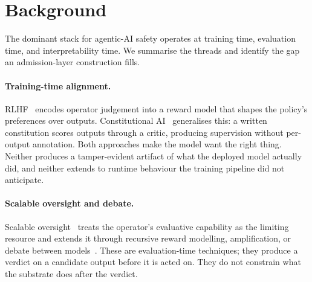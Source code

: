 \section{Background}
\label{sec:background}

The dominant stack for agentic-AI safety operates at training time, evaluation time, and interpretability time. We summarise the threads and identify the gap an admission-layer construction fills.

\paragraph{Training-time alignment.}
RLHF~\cite{ouyangRLHF2022} encodes operator judgement into a reward model that shapes the policy's preferences over outputs. Constitutional AI~\cite{baiConstitutionalAI2022} generalises this: a written constitution scores outputs through a critic, producing supervision without per-output annotation. Both approaches make the model want the right thing. Neither produces a tamper-evident artifact of what the deployed model actually did, and neither extends to runtime behaviour the training pipeline did not anticipate.

\paragraph{Scalable oversight and debate.}
Scalable oversight~\cite{leikeScalableOversight2018,bowmanScalableOversight2022} treats the operator's evaluative capability as the limiting resource and extends it through recursive reward modelling, amplification, or debate between models~\cite{christianoDebate2018}. These are evaluation-time techniques; they produce a verdict on a candidate output before it is acted on. They do not constrain what the substrate does after the verdict.

